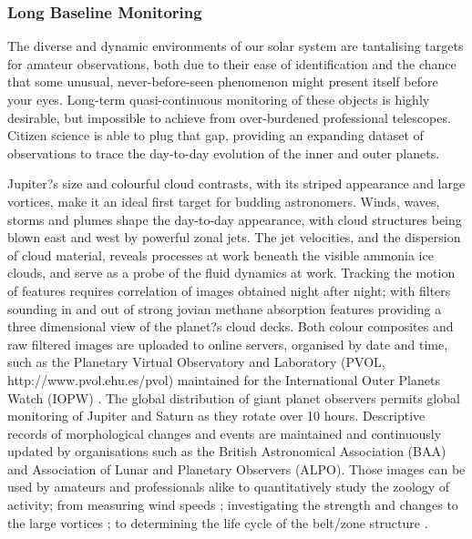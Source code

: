 \documentclass{ar2e}
\begin{document}
\subsubsection{Long Baseline Monitoring}

The diverse and dynamic environments of our solar system are tantalising
targets for amateur observations, both due to their ease of identification and
the chance that some unusual, never-before-seen phenomenon might present
itself before your eyes.  Long-term quasi-continuous monitoring of these
objects is highly desirable, but impossible to achieve from over-burdened
professional telescopes.  Citizen science is able to plug that gap, providing
an expanding dataset of observations to trace the day-to-day evolution of the
inner and outer planets. 

Jupiter?s size and colourful cloud contrasts, with its striped appearance and
large vortices, make it an ideal first target for budding astronomers.  Winds,
waves, storms and plumes shape the day-to-day appearance, with cloud
structures being blown east and west by powerful zonal jets.  The jet
velocities, and the dispersion of cloud material, reveals processes at work
beneath the visible ammonia ice clouds, and serve as a probe of the fluid
dynamics at work.  Tracking the motion of features requires correlation of
images obtained night after night; with filters sounding in and out of strong
jovian methane absorption features providing a three dimensional view of the
planet?s cloud decks.  Both colour composites and raw filtered images are
uploaded to online servers, organised by date and time, such as the Planetary
Virtual Observatory and Laboratory (PVOL, http://www.pvol.ehu.es/pvol)
maintained for the International Outer Planets Watch (IOPW) \citep{10hueso}. 
The global distribution of giant planet observers permits global monitoring of
Jupiter and Saturn as they rotate over 10 hours.  Descriptive records of
morphological changes and events are maintained and continuously updated by
organisations such as the British Astronomical Association (BAA) and
Association of Lunar and Planetary Observers (ALPO).   Those images can be
used by amateurs and professionals alike to quantitatively study the zoology
of activity; from measuring wind speeds \citep{08sanchez}; investigating the
strength and changes to the large vortices \citep[e.g., the 2006 reddening of
Oval BA,][]{06simon-miller}; to determining the life cycle of the belt/zone
structure \citep{96sanchez, 11fletcher}. 
\end{document}
